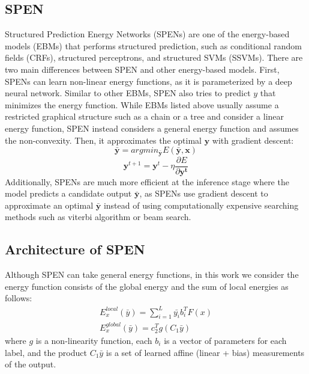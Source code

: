 \documentclass[11pt,letterpaper]{article}
\begin{document}
\subsection{SPEN}
Structured Prediction Energy Networks (SPENs) \cite{DBLP:journals/corr/BelangerM15}\cite{belanger2017end} are one of the energy-based models (EBMs) that performs structured prediction, such as conditional random fields (CRFs), structured perceptrons, and structured SVMs (SSVMs).
There are two main differences between SPEN and other energy-based models. First, SPENs can learn non-linear energy functions, as it is parameterized by a deep neural network. Similar to other EBMs, SPEN also tries to predict $y$ that minimizes the energy function. While EBMs listed above usually assume a restricted graphical structure such as a chain or a tree and consider a linear energy function, SPEN instead considers a general energy function and assumes the non-convexity. Then, it approximates the optimal $\mathbf{y}$ with gradient descent:
\begin{equation}
\mathbf{\bar{y}} = argmin_{\mathbf{\bar{y}}} E( \mathbf{\bar{y}}, \mathbf{x} )
\end{equation}
\begin{equation}
\mathbf{y}^{t+1} = \mathbf{y}^t - \eta \frac{ \partial E }{ \partial \mathbf{y^t}}
\end{equation}
Additionally, SPENs are much more efficient at the inference stage where the model predicts a candidate output $\bar{\mathbf{y}}$, as SPENs use gradient descent to approximate an optimal $\bar{\mathbf{y}}$ instead of using computationally expensive searching methods such as viterbi algorithm or beam search.
\subsection{Architecture of SPEN}
Although SPEN can take general energy functions, in this work we consider the energy function consists of the global energy and the sum of local energies as follows:
\begin{align}
E_x^{local}(\bar{y}) = \sum^L_{i=1} \bar{y_i} b_i^T F(x) \\
E_x^{global}(\bar{y}) = c_2^T g(C_1 \bar{y})
\end{align}
where $g$ is a non-linearity function, each $b_i$ is a vector of parameters for each label, and the product $C_1 \bar{y}$ is a set of learned affine (linear + bias)
measurements of the output.
\end{document}
